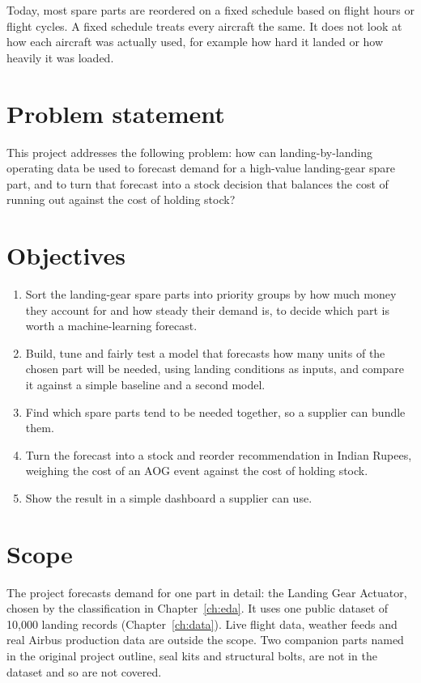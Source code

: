 \documentclass[12pt,oneside]{report}
\begin{document}
Today, most spare parts are reordered on a fixed schedule based on flight hours or flight cycles. A fixed schedule treats every aircraft the same. It does not look at how each aircraft was actually used, for example how hard it landed or how heavily it was loaded.

\section{Problem statement}
This project addresses the following problem: how can landing-by-landing operating data be used to forecast demand for a high-value landing-gear spare part, and to turn that forecast into a stock decision that balances the cost of running out against the cost of holding stock?

\section{Objectives}
\begin{enumerate}
\item Sort the landing-gear spare parts into priority groups by how much money they account for and how steady their demand is, to decide which part is worth a machine-learning forecast.
\item Build, tune and fairly test a model that forecasts how many units of the chosen part will be needed, using landing conditions as inputs, and compare it against a simple baseline and a second model.
\item Find which spare parts tend to be needed together, so a supplier can bundle them.
\item Turn the forecast into a stock and reorder recommendation in Indian Rupees, weighing the cost of an AOG event against the cost of holding stock.
\item Show the result in a simple dashboard a supplier can use.
\end{enumerate}

\section{Scope}
The project forecasts demand for one part in detail: the Landing Gear Actuator, chosen by the classification in Chapter~\ref{ch:eda}. It uses one public dataset of 10,000 landing records (Chapter~\ref{ch:data}). Live flight data, weather feeds and real Airbus production data are outside the scope. Two companion parts named in the original project outline, seal kits and structural bolts, are not in the dataset and so are not covered.
\end{document}
